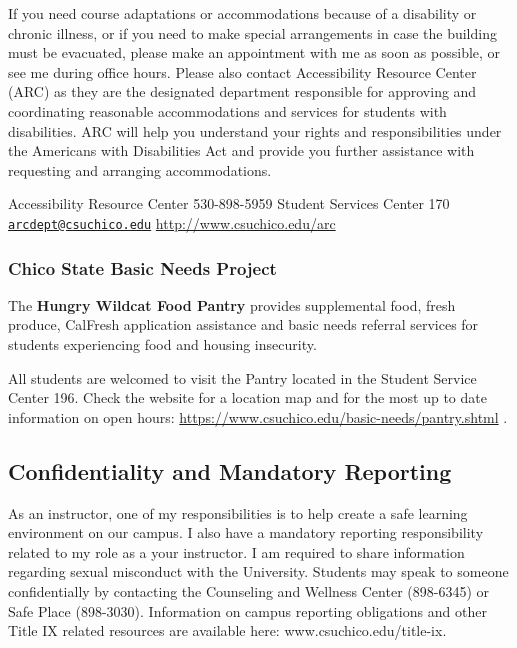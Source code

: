 \documentclass[
  11pt,
]{article}
\begin{document}
If you need course adaptations or accommodations because of a disability
or chronic illness, or if you need to make special arrangements in case
the building must be evacuated, please make an appointment with me as
soon as possible, or see me during office hours. Please also contact
Accessibility Resource Center (ARC) as they are the designated
department responsible for approving and coordinating reasonable
accommodations and services for students with disabilities. ARC will
help you understand your rights and responsibilities under the Americans
with Disabilities Act and provide you further assistance with requesting
and arranging accommodations.

Accessibility Resource Center 530-898-5959 Student Services Center 170
\href{mailto:arcdept@csuchico.edu}{\nolinkurl{arcdept@csuchico.edu}}
\url{http://www.csuchico.edu/arc}

\hypertarget{chico-state-basic-needs-project}{%
\subsubsection{Chico State Basic Needs
Project}\label{chico-state-basic-needs-project}}

The \textbf{Hungry Wildcat Food Pantry} provides supplemental food,
fresh produce, CalFresh application assistance and basic needs referral
services for students experiencing food and housing insecurity.

All students are welcomed to visit the Pantry located in the Student
Service Center 196. Check the website for a location map and for the
most up to date information on open hours:
\url{https://www.csuchico.edu/basic-needs/pantry.shtml} .

\hypertarget{confidentiality-and-mandatory-reporting}{%
\subsection{Confidentiality and Mandatory
Reporting}\label{confidentiality-and-mandatory-reporting}}

As an instructor, one of my responsibilities is to help create a safe
learning environment on our campus. I also have a mandatory reporting
responsibility related to my role as a your instructor. I am required to
share information regarding sexual misconduct with the University.
Students may speak to someone confidentially by contacting the
Counseling and Wellness Center (898-6345) or Safe Place (898-3030).
Information on campus reporting obligations and other Title IX related
resources are available here: www.csuchico.edu/title-ix.
\end{document}
